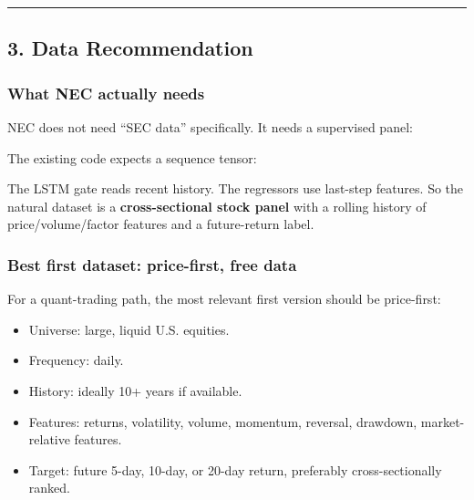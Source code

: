 \begin{center}\rule{0.5\linewidth}{0.5pt}\end{center}

\subsection{3. Data Recommendation}\label{data-recommendation}

\subsubsection{What NEC actually needs}\label{what-nec-actually-needs}

NEC does not need ``SEC data'' specifically. It needs a supervised
panel:

\begin{Shaded}
\begin{Highlighting}[]
\end{Highlighting}
\end{Shaded}

The existing code expects a sequence tensor:

\begin{Shaded}
\begin{Highlighting}[]
\end{Highlighting}
\end{Shaded}

The LSTM gate reads recent history. The regressors use last-step
features. So the natural dataset is a \textbf{cross-sectional stock
panel} with a rolling history of price/volume/factor features and a
future-return label.

\subsubsection{Best first dataset: price-first, free
data}\label{best-first-dataset-price-first-free-data}

For a quant-trading path, the most relevant first version should be
price-first:

\begin{itemize}
\tightlist
\item
  Universe: large, liquid U.S. equities.
\item
  Frequency: daily.
\item
  History: ideally 10+ years if available.
\item
  Features: returns, volatility, volume, momentum, reversal, drawdown,
  market-relative features.
\item
  Target: future 5-day, 10-day, or 20-day return, preferably
  cross-sectionally ranked.
\end{itemize}

